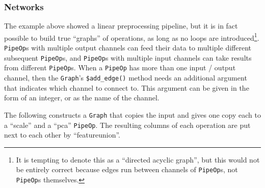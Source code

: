 \documentclass[
]{scrbook}
\begin{document}
\hypertarget{networks}{%
\subsubsection{Networks}\label{networks}}

The example above showed a linear preprocessing pipeline, but it is in fact possible to build true ``graphs'' of operations, as long as no loops are introduced\footnote{It is tempting to denote this as a ``directed acyclic graph'', but this would not be entirely correct because edges run between channels of \texttt{PipeOp}s, not \texttt{PipeOp}s themselves.}.
\texttt{PipeOp}s with multiple output channels can feed their data to multiple different subsequent \texttt{PipeOp}s, and \texttt{PipeOp}s with multiple input channels can take results from different \texttt{PipeOp}s.
When a \texttt{PipeOp} has more than one input / output channel, then the \texttt{Graph}'s \texttt{\$add\_edge()} method needs an additional argument that indicates which channel to connect to.
This argument can be given in the form of an integer, or as the name of the channel.

The following constructs a \texttt{Graph} that copies the input and gives one copy each to a ``scale'' and a ``pca'' \texttt{PipeOp}.
The resulting columns of each operation are put next to each other by ``featureunion''.
\end{document}
